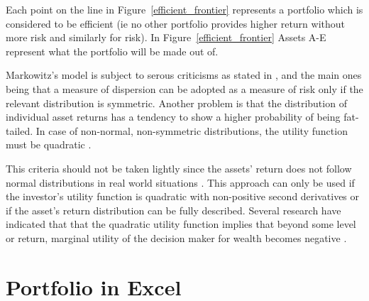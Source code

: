\documentclass{pdfmx4020}
\begin{document}
    Each point on the line in Figure~\ref{efficient_frontier} represents a portfolio which is considered to be efficient (ie no other portfolio provides higher return without more risk and similarly for risk). In Figure~\ref{efficient_frontier} Assets A-E represent what the portfolio will be made out of. 

    Markowitz's model is subject to serous criticisms as stated in \cite{crit}, and the main ones being that a measure of dispersion can be adopted as a measure of risk only if the relevant distribution is symmetric. Another problem is that the distribution of individual asset returns has a tendency to show a higher probability of being fat-tailed. In case of non-normal, non-symmetric distributions, the utility function must be quadratic \cite{crit}. 

    This criteria should not be taken lightly since the assets' return does not follow normal distributions in real world situations \cite{non-dist}. This approach can only be used if the investor's utility function is quadratic with non-positive second derivatives or if the asset's return distribution can be fully described. Several research have indicated that that the quadratic utility function implies that beyond some level or return, marginal utility of the decision maker for wealth becomes negative \cite{crit2,crit3}. 

  





  \section{Portfolio in Excel} %
  \label{sec:portfolio_in_excel}
    
\end{document}
